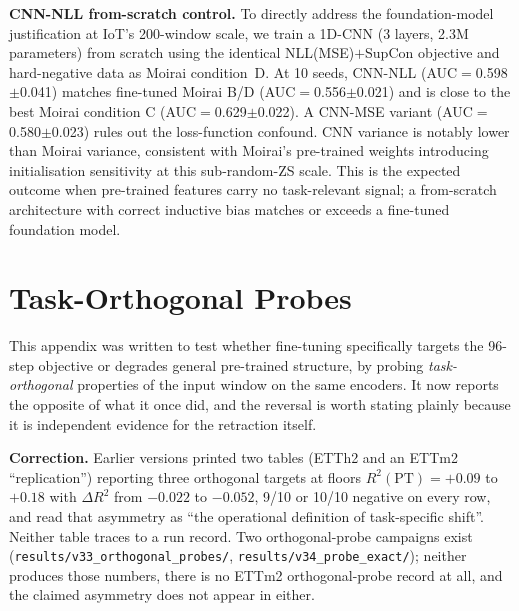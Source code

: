 \textbf{CNN-NLL from-scratch control.}
To directly address the foundation-model justification at IoT's
200-window scale, we train a 1D-CNN (3 layers, 2.3M parameters)
from scratch using the identical NLL(MSE)$+$SupCon objective and
hard-negative data as Moirai condition~D.  At 10 seeds,
CNN-NLL (AUC$=$0.598$\pm$0.041) matches fine-tuned Moirai B/D
(AUC$=$0.556$\pm$0.021) and is close to the best Moirai condition
C (AUC$=$0.629$\pm$0.022).  A CNN-MSE variant (AUC$=$0.580$\pm$0.023)
rules out the loss-function confound.  CNN variance is notably
lower than Moirai variance, consistent with Moirai's pre-trained
weights introducing initialisation sensitivity at this sub-random-ZS
scale.  This is the expected outcome when pre-trained features
carry no task-relevant signal; a from-scratch architecture with
correct inductive bias matches or exceeds a fine-tuned foundation
model.

\section{Task-Orthogonal Probes}
\label{app:orthogonal}

\noindent{}
\vspace{1em}

This appendix was written to test whether fine-tuning specifically targets the
96-step objective or degrades general pre-trained structure, by probing
\emph{task-orthogonal} properties of the input window on the same encoders.  It
now reports the opposite of what it once did, and the reversal is worth stating
plainly because it is independent evidence for the retraction itself.

\textbf{Correction.}  Earlier versions printed two tables (ETTh2 and an ETTm2
``replication'') reporting three orthogonal targets at floors
$R^2(\text{PT}){=}{+}0.09$ to ${+}0.18$ with $\Delta R^2$ from $-0.022$ to
$-0.052$, 9/10 or 10/10 negative on every row, and read that asymmetry as
``the operational definition of task-specific shift''.  Neither table traces to a
run record.  Two orthogonal-probe campaigns exist
(\texttt{results/v33\_orthogonal\_probes/},
\texttt{results/v34\_probe\_exact/}); neither produces those numbers, there is no
ETTm2 orthogonal-probe record at all, and the claimed asymmetry does not appear
in either.

